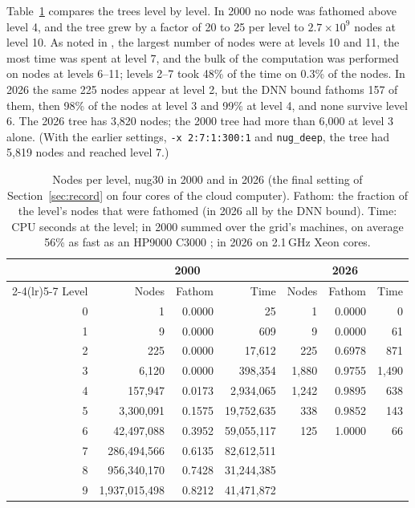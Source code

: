\documentclass[10pt]{article}
\theoremstyle{remark}
\begin{document}
Table~\ref{tab:levels} compares the trees level by level. In 2000 no node was fathomed above level 4, and the tree grew by a factor of
20 to 25 per level to $2.7\times10^9$ nodes at level 10. As noted in \cite{thesis},
the largest number of nodes were at levels 10 and 11, the most time was spent at
level 7, and the bulk of the computation was performed on nodes at levels 6--11;
levels 2--7 took 48\% of the time on 0.3\% of the nodes. In 2026 the same 225 nodes
appear at level 2, but the DNN bound fathoms 157 of them, then 98\% of the nodes at
level 3 and 99\% at level 4, and none survive level 6. The 2026 tree has 3,820
nodes; the 2000 tree had more than 6,000 at level 3 alone. (With the earlier
settings, \texttt{-x 2:7:1:300:1} and \texttt{nug\_deep}, the tree had 5,819 nodes and
reached level 7.)

\begin{table}[p]\centering
\caption{Nodes per level, nug30 in 2000 and in 2026 (the final setting of
Section~\ref{sec:record} on four cores of the cloud computer). Fathom: the fraction of
the level's nodes that were fathomed (in 2026 all by the DNN bound). Time: CPU
seconds at the level; in 2000 summed over the grid's machines, on average 56\% as fast
as an HP9000 C3000 \cite{thesis}; in 2026 on 2.1\,GHz Xeon cores.}\label{tab:levels}
\small\setlength{\tabcolsep}{4pt}
\begin{tabular}{rrrrrrr}
\toprule
& \multicolumn{3}{c}{2000 \cite[Table~5.12]{thesis}} & \multicolumn{3}{c}{2026}\\
\cmidrule(lr){2-4}\cmidrule(lr){5-7}
Level & Nodes & Fathom & Time & Nodes & Fathom & Time\\
\midrule
0 & 1 & 0.0000 & 25 & 1 & 0.0000 & 0\\
1 & 9 & 0.0000 & 609 & 9 & 0.0000 & 61\\
2 & 225 & 0.0000 & 17,612 & 225 & 0.6978 & 871\\
3 & 6,120 & 0.0000 & 398,354 & 1,880 & 0.9755 & 1,490\\
4 & 157,947 & 0.0173 & 2,934,065 & 1,242 & 0.9895 & 638\\
5 & 3,300,091 & 0.1575 & 19,752,635 & 338 & 0.9852 & 143\\
6 & 42,497,088 & 0.3952 & 59,055,117 & 125 & 1.0000 & 66\\
7 & 286,494,566 & 0.6135 & 82,612,511 & & &\\
8 & 956,340,170 & 0.7428 & 31,244,385 & & &\\
9 & 1,937,015,498 & 0.8212 & 41,471,872 & & &\\

\end{tabular}
\end{table}
\end{document}
